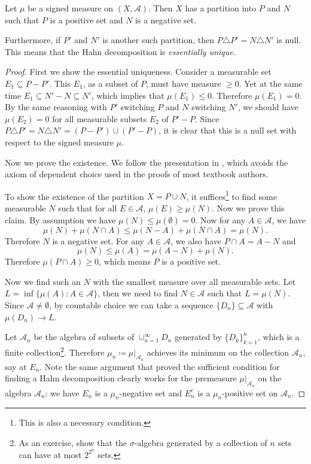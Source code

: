 \documentclass[10pt]{book}
\makeatletter
\numberwithin{equation}{chapter}
\theoremstyle{plain-star}
\theoremstyle{definition-star}
\theoremstyle{remark-star}
\newcommand\thmsname{Theorem}
\newcommand\nm@thmtype{theorem}
\theoremstyle{plain-star}
\newenvironment{namedthm}[1][Undefined Theorem Name]{
    \ifx{#1}{Undefined Theorem Name}
    \renewcommand\nm@thmtype{theorem}
    \else\renewcommand\thmsname{#1}
    \renewcommand\nm@thmtype{namedtheorem}
    \fi
    \begin{\nm@thmtype}\def\@currentlabelname{#1}}
    {\end{\nm@thmtype}}
\newcommand{\A}{\mathcal{A}}
\newcommand{\cpl}{\mathrm{c}}
\newcommand{\symdiff}{\triangle}
\makeatother
\begin{document}
\begin{namedthm}[Hahn decomposition] \label{thm:hahn-decomp}
    Let $\mu$ be a signed measure on $(X,\A)$. Then $X$ has a partition into $P$ and $N$ such that $P$ is a positive set and $N$ is a negative set.

    Furthermore, if $P'$ and $N'$ is another such partition, then $P \symdiff P' = N \symdiff N'$ is null. This means that the Hahn decomposition is \emph{essentially unique}.
\end{namedthm}
\begin{proof}
    First we show the essential uniqueness. Consider a measurable set $E_1 \subseteq P - P'$. This $E_1$, as a subset of $P$, must have measure $\geq 0$. Yet at the same time $E_1 \subseteq N' - N\subseteq N'$, which implies that $\mu(E_1)\leq 0$. Therefore $\mu(E_1) = 0$. By the same reasoning with $P'$ switching $P$ and $N$ switching $N'$, we should have $\mu(E_2) = 0$ for all measurable subsets $E_2$ of $P'-P$. Since $P\symdiff P' = N \symdiff N' = (P - P')\cup(P' - P)$, it is clear that this is a null set with respect to the signed measure $\mu$.

    Now we prove the existence. We follow the presentation in \cite{Falkner_2019}, which avoids the axiom of dependent choice used in the proofs of most textbook authors.

    To show the existence of the partition $X = P \cup N$, it suffices\footnote{This is also a necessary condition.} to find some measurable $N$ such that for all $E \in \A$, $\mu(E)\geq \mu(N)$. Now we prove this claim. By assumption we have $\mu(N)\leq \mu(\emptyset) = 0$. Now for any $A \in \A$, we have \[
        \mu(N) + \mu(N\cap A) \leq \mu(N-A) + \mu(N\cap A) = \mu(N).
    \] Therefore $N$ is a negative set. For any $A \in \A$, we also have $P\cap A = A - N$ and \[
        \mu(N) \leq \mu(A) = \mu(A - N) + \mu(N).
    \] Therefore $\mu(P\cap A)\geq 0$, which means $P$ is a positive set.
    
    Now we find such an $N$ with the smallest measure over all measurable sets. Let $L = \inf\{\mu(A): A\in \A\}$, then we need to find $N \in \A$ such that $L = \mu(N)$. Since $\A \neq \emptyset$, by countable choice we can take a sequence $\{D_n\}\subseteq \A$ with $\mu(D_n)\to L$.

    Let $\A_n$ be the algebra of subsets of $\cup_{n=1}^\infty D_n$ generated by $\{D_k\}_{k=1}^n$, which is a finite collection\footnote{As an exercise, show that the $\sigma$-algebra generated by a collection of $n$ sets can have at most $2^{2^n}$ sets.}. Therefore $\mu_n \coloneqq \mu|_{\A_n}$ achieves its minimum on the collection $\A_n$, say at $E_n$. Note the same argument that proved the sufficient condition for finding a Hahn decomposition clearly works for the premeasure $\mu|_{\A_n}$ on the algebra $\A_n$: we have $E_n$ is a $\mu_n$-negative set and $E_n^\cpl$ is a $\mu_n$-positive set on $\A_n$.


\end{proof}
\end{document}

